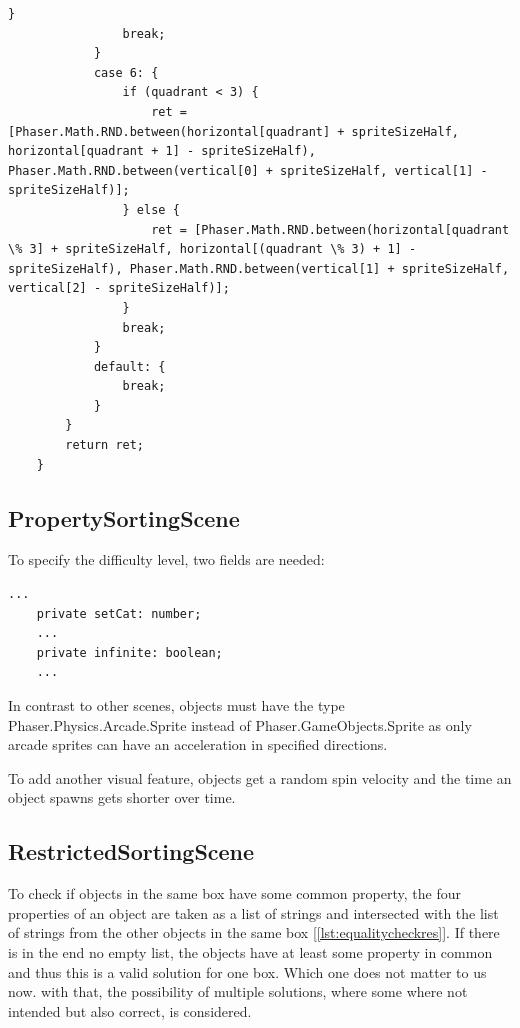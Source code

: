 \begin{lstlisting}[style=TypeScript, caption={returnQuad() (sortingScene.ts)}, label={lst:returnquad}]
                }
                break;
            }
            case 6: {
                if (quadrant < 3) {
                    ret = [Phaser.Math.RND.between(horizontal[quadrant] + spriteSizeHalf, horizontal[quadrant + 1] - spriteSizeHalf), Phaser.Math.RND.between(vertical[0] + spriteSizeHalf, vertical[1] - spriteSizeHalf)];
                } else {
                    ret = [Phaser.Math.RND.between(horizontal[quadrant \% 3] + spriteSizeHalf, horizontal[(quadrant \% 3) + 1] - spriteSizeHalf), Phaser.Math.RND.between(vertical[1] + spriteSizeHalf, vertical[2] - spriteSizeHalf)];
                }
                break;
            }
            default: {
                break;
            }
        }
        return ret;
    }
\end{lstlisting}

\subsection{PropertySortingScene}\label{subsec:propertysortingscene}
To specify the difficulty level, two fields are needed:

\begin{lstlisting}[style=TypeScript, caption={Level fields (propertySortingScene.ts)}]
    ...
    private setCat: number;
    ...
    private infinite: boolean;
    ...
\end{lstlisting}

In contrast to other scenes, objects must have the type Phaser.Physics.Arcade.Sprite instead of
Phaser.GameObjects.Sprite as only arcade sprites can have an acceleration in specified directions.

To add another visual feature, objects get a random spin velocity and the time an object spawns gets shorter over time.

\subsection{RestrictedSortingScene}\label{subsec:restrictedsortingscene}
To check if objects in the same box have some common property,
the four properties of an object are taken as a list of strings and intersected with the list of strings from the other
objects in the same box [\ref{lst:equalitycheckres}].
If there is in the end no empty list, the objects have at least some property in common and thus this is a valid
solution for one box.
Which one does not matter to us now.
with that, the possibility of multiple solutions, where some where not intended but also correct, is considered.

